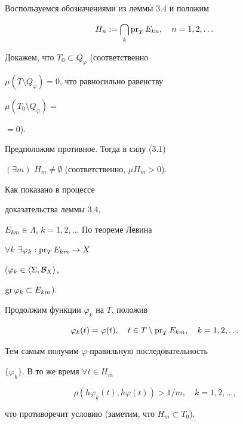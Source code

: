 \begin{pf} Воспользуемся обозначениями из леммы 3.4 и положим


$$


H_n := \bigcap\limits_k\pr_T E_{kn},\quad n=1,2,\dotsc


$$





Докажем, что $T_0\subset Q_\varphi$ (соответственно


$\mu(T\setminus Q_\varphi)=0$, что равносильно равенству


$\mu(T_0\setminus Q_\varphi)=$\linebreak




$=0$).


Предположим противное. Тогда в силу (3.1) 


$(\exists m)$ $H_m\ne\emptyset$ (соответственно, $\mu H_m>0$).


Как показано в процессе


доказательства леммы 3.4,


$E_{km}\in\Lambda$, $k=1,2,\dotsc$ По теореме Левина


$\forall k$ \; $\exists\varphi_k:\operatorname{pr}_T E_{km}\to X$


($\varphi_k\in \langle \Sigma,{\cal B}_X\rangle$,


$\operatorname{gr}\varphi_k\subset E_{km}$).





Продолжим функции $\varphi_k$ на $T$, положив


$$


\varphi_k(t)=\varphi(t), \quad t\in T\setminus\pr_T E_{km}, \quad


k=1,2,\dotsc


$$


Тем самым получим $\varphi$-правильную последовательность


$\{\varphi_k\}$. В то же время $\forall t\in H_m$


%


\begin{equation}


\rho(h\varphi_k(t),h\varphi(t))>1/m, \quad k=1,2,\dotsc,


\end{equation}


%


что противоречит условию (заметим, что $H_m\subset T_0$).


\end{pf}





